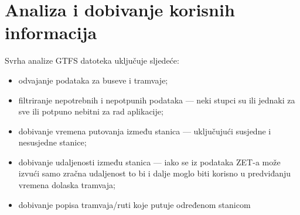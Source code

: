 \documentclass[times, utf8, diplomski]{fer}
\begin{document}
\section{Analiza i dobivanje korisnih informacija}
Svrha analize GTFS datoteka uključuje sljedeće:
\begin{itemize}
    \item odvajanje podataka za buseve i tramvaje;
    \item filtriranje nepotrebnih i nepotpunih podataka --- neki stupci su ili jednaki za sve ili potpuno nebitni za rad aplikacije;
    \item dobivanje vremena putovanja između stanica --- uključujući susjedne i nesusjedne stanice;
    \item dobivanje udaljenosti između stanica --- iako se iz podataka ZET-a može izvući samo zračna udaljenost to bi i dalje moglo biti korisno u predviđanju vremena dolaska tramvaja;
    \item dobivanje popisa tramvaja/ruti koje putuje određenom stanicom
\end{itemize}
\end{document}
